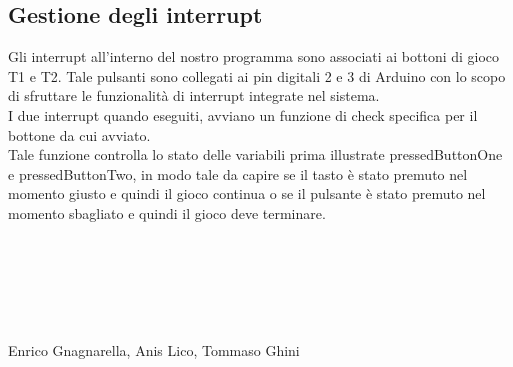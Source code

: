 \documentclass[a4paper]{article}
\begin{document}
\subsection*{Gestione degli interrupt}
Gli interrupt all'interno del nostro programma sono associati ai bottoni di gioco T1 e T2.
Tale pulsanti sono collegati ai pin digitali 2 e 3 di Arduino con lo scopo di sfruttare le funzionalità di interrupt integrate nel sistema.
\\I due interrupt quando eseguiti, avviano un funzione di check specifica per il bottone da cui avviato.
\\Tale funzione controlla lo stato delle variabili prima illustrate pressedButtonOne e pressedButtonTwo, in modo tale da capire se il tasto è stato premuto nel momento giusto e quindi il gioco continua o se il pulsante è stato premuto nel momento sbagliato e quindi il gioco deve terminare.
\\
\\
\\
\\
\\
\\
\\
Enrico Gnagnarella, Anis Lico, Tommaso Ghini
\end{document}

